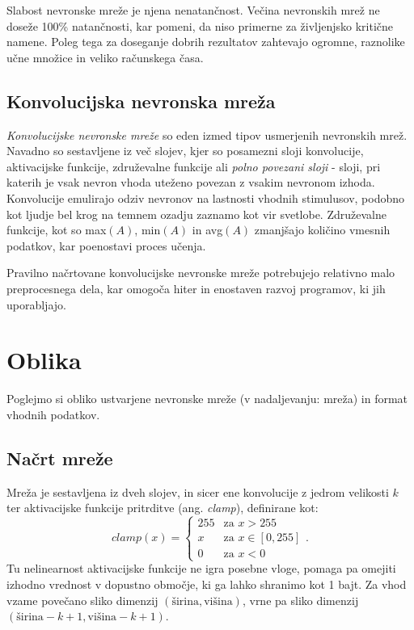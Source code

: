 \documentclass[a4paper,11pt,titlepage]{article}
\begin{document}
Slabost nevronske mreže je njena nenatančnost.
Večina nevronskih mrež ne doseže 100\% natančnosti, kar pomeni, da niso primerne za življenjsko kritične namene.
Poleg tega za doseganje dobrih rezultatov zahtevajo ogromne, raznolike učne množice in veliko računskega časa.\cite{ann_compute}

\subsection{Konvolucijska nevronska mreža}

\emph{Konvolucijske nevronske mreže} so eden izmed tipov usmerjenih nevronskih mrež.
Navadno so sestavljene iz več slojev, kjer so posamezni sloji konvolucije, aktivacijske funkcije, združevalne funkcije ali
	\emph{polno povezani sloji} - sloji, pri katerih je vsak nevron vhoda uteženo povezan z vsakim nevronom izhoda.
Konvolucije emulirajo odziv nevronov na lastnosti vhodnih stimulusov,\cite{cnn_conv} podobno kot ljudje bel krog na temnem ozadju zaznamo kot
	vir svetlobe.
Združevalne funkcije, kot so max$(A)$, min$(A)$ in avg$(A)$ zmanjšajo količino vmesnih podatkov, kar poenostavi proces učenja.\cite{cnn_pool}

Pravilno načrtovane konvolucijske nevronske mreže potrebujejo relativno malo preprocesnega dela, kar omogoča hiter in enostaven razvoj programov,
	ki jih uporabljajo.

\section{Oblika}

Poglejmo si obliko ustvarjene nevronske mreže (v nadaljevanju: mreža) in format vhodnih podatkov.

\subsection{Načrt mreže}

Mreža je sestavljena iz dveh slojev, in sicer ene konvolucije z jedrom velikosti $k$ ter aktivacijske funkcije pritrditve (ang. \emph{clamp}),
	definirane kot:
\begin{equation*} 
clamp(x) = \begin{cases}
	255 & \text{za } x > 255 \\
	x & \text{za } x \in [0, 255] \\
	0 & \text{za } x < 0
\end{cases}.
\end{equation*}
Tu nelinearnost aktivacijske funkcije ne igra posebne vloge, pomaga pa omejiti izhodno vrednost v dopustno območje, ki ga lahko shranimo kot 1 bajt.
Za vhod vzame povečano sliko dimenzij $(\text{širina}, \text{višina})$, vrne pa sliko dimenzij $(\text{širina} - k + 1, \text{višina} - k + 1)$.
\end{document}
